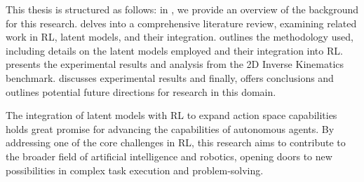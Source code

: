 This thesis is structured as follows: in , we provide an overview of the background for this research.  delves into a comprehensive literature review, examining related work in RL, latent models, and their integration.  outlines the methodology used, including details on the latent models employed and their integration into RL.  presents the experimental results and analysis from the 2D Inverse Kinematics benchmark.  discusses experimental results and finally,  offers conclusions and outlines potential future directions for research in this domain.

The integration of latent models with RL to expand action space capabilities holds great promise for advancing the capabilities of autonomous agents. By addressing one of the core challenges in RL, this research aims to contribute to the broader field of artificial intelligence and robotics, opening doors to new possibilities in complex task execution and problem-solving.





